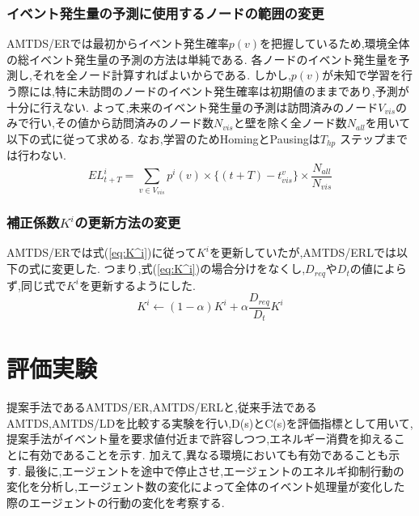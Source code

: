 \documentclass[12pt,a4j,twoside]{jarticle}
\begin{document}
  \subsubsection{イベント発生量の予測に使用するノードの範囲の変更}
  AMTDS/ERでは最初からイベント発生確率$p(v)$を把握しているため,環境全体の総イベント発生量の予測の方法は単純である.
  各ノードのイベント発生量を予測し,それを全ノード計算すればよいからである.
  しかし,$p(v)$が未知で学習を行う際には,特に未訪問のノードのイベント発生確率は初期値のままであり,予測が十分に行えない.
  よって,未来のイベント発生量の予測は訪問済みのノード$V_{vis}$のみで行い,その値から訪問済みのノード数$N_{vis}$と壁を除く全ノード数$N_{all}$を用いて以下の式に従って求める.
  なお,学習のためHomingとPausingは$T_{hp}$ ステップまでは行わない.
  \begin{equation}
    EL^i_{t+T} = \sum_{v \in V_{vis}} p^i(v) \times \{ (t+T) - t^v_{vis}\} \times \dfrac{N_{all}}{N_{vis}}
  \end{equation}

  \subsubsection{補正係数$K^i$の更新方法の変更}
  \label{subsec:changeupdate}
  AMTDS/ERでは式(\ref{eq:K^i})に従って$K^i$を更新していたが,AMTDS/ERLでは以下の式に変更した.
  つまり,式(\ref{eq:K^i})の場合分けをなくし,$D_{req}$や$D_t$の値によらず,同じ式で$K^i$を更新するようにした.
  \begin{equation}
    K^i \gets (1 - \alpha)K^i + \alpha\dfrac{D_{req}}{D_t}K^i
  \end{equation}

  \section{評価実験}
  提案手法であるAMTDS/ER,AMTDS/ERLと,従来手法であるAMTDS,AMTDS/LDを比較する実験を行い,D(s)とC(s)を評価指標として用いて,提案手法がイベント量を要求値付近まで許容しつつ,エネルギー消費を抑えることに有効であることを示す.
  加えて,異なる環境においても有効であることも示す.
  最後に,エージェントを途中で停止させ,エージェントのエネルギ抑制行動の変化を分析し,エージェント数の変化によって全体のイベント処理量が変化した際のエージェントの行動の変化を考察する.
  
\end{document}
